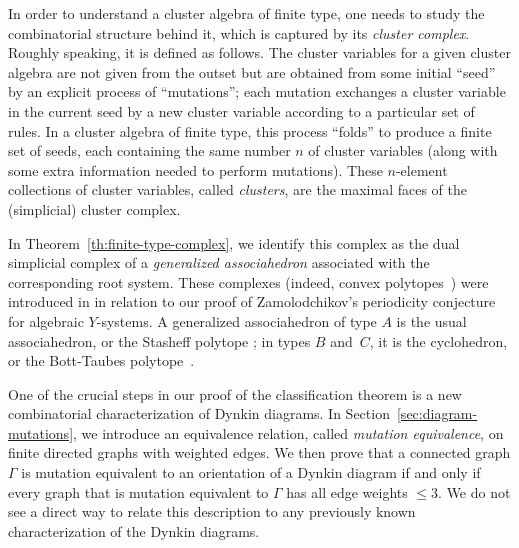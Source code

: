 \documentclass[letterpaper]{amsart}
\numberwithin{equation}{section}
\theoremstyle{definition}
\begin{document}
In order to understand a cluster algebra of finite type, 
one needs to study the combinatorial structure behind it, 
which is captured by its \emph{cluster complex}. 
Roughly speaking, it is defined as follows. 
The cluster variables for a given cluster algebra 
are not given from the outset 
but are obtained from some %
initial ``seed'' by an explicit process of ``mutations''; 
each mutation exchanges a cluster variable in the current seed by 
a new cluster variable according to a particular set of rules. 
In a cluster algebra of finite type, this process ``folds'' to 
produce a finite set of seeds, each containing the same number $n$ of 
cluster variables (along with some extra information needed to perform 
mutations). These $n$-element collections of cluster variables, 
called \emph{clusters}, are the maximal faces of the (simplicial) 
cluster complex. 
 
 
In Theorem~\ref{th:finite-type-complex}, we identify this complex 
as the dual simplicial complex of a \emph{generalized associahedron} 
associated with the corresponding root system. 
These complexes (indeed, convex polytopes~\cite{cfz}) 
were introduced in \cite{yga} in relation to 
our proof of Zamolodchikov's periodicity conjecture for algebraic 
\hbox{$Y$-systems.} 
A generalized associahedron of type $A$ is the usual 
associahedron, or the Stasheff polytope \cite{stasheff}; 
in types $B$ and~$C$, it is the 
cyclohedron, or the Bott-Taubes polytope~\cite{bott-taubes,simion-B}. 
 
One of the crucial steps in our proof of the classification theorem 
is a new combinatorial characterization of Dynkin diagrams. 
In Section~\ref{sec:diagram-mutations}, 
we introduce an equivalence relation, 
called \emph{mutation equivalence}, 
on finite directed graphs with weighted edges. 
We then prove 
that a connected graph 
$\Gamma$ is mutation equivalent to an orientation of a Dynkin diagram 
if and only if every graph that is mutation equivalent to  $\Gamma$ 
has all edge weights $\leq 3$. 
We do not see a direct way to relate this description to any 
previously known 
characterization of the Dynkin diagrams. 
 
\end{document}
